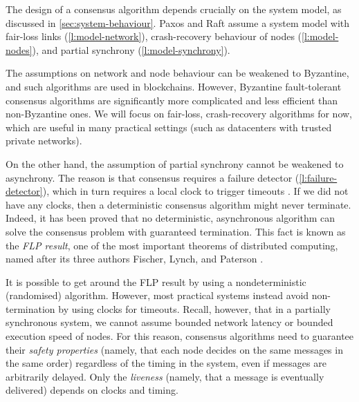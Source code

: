 The design of a consensus algorithm depends crucially on the system model, as discussed in \autoref{sec:system-behaviour}.
Paxos and Raft assume a system model with fair-loss links (\autoref{l:model-network}), crash-recovery behaviour of nodes (\autoref{l:model-nodes}), and partial synchrony (\autoref{l:model-synchrony}).

The assumptions on network and node behaviour can be weakened to Byzantine, and such algorithms are used in blockchains.
However, Byzantine fault-tolerant consensus algorithms are significantly more complicated and less efficient than non-Byzantine ones.
We will focus on fair-loss, crash-recovery algorithms for now, which are useful in many practical settings (such as datacenters with trusted private networks).

On the other hand, the assumption of partial synchrony cannot be weakened to asynchrony.
The reason is that consensus requires a failure detector (\autoref{l:failure-detector}), which in turn requires a local clock to trigger timeouts \citep{Chandra:1996}.
If we did not have any clocks, then a deterministic consensus algorithm might never terminate.
Indeed, it has been proved that no deterministic, asynchronous algorithm can solve the consensus problem with guaranteed termination.
This fact is known as the \emph{FLP result}, one of the most important theorems of distributed computing, named after its three authors Fischer, Lynch, and Paterson \citep{Fischer:1985}.

It is possible to get around the FLP result by using a nondeterministic (randomised) algorithm.
However, most practical systems instead avoid non-termination by using clocks for timeouts.
Recall, however, that in a partially synchronous system, we cannot assume bounded network latency or bounded execution speed of nodes.
For this reason, consensus algorithms need to guarantee their \emph{safety properties} (namely, that each node decides on the same messages in the same order) regardless of the timing in the system, even if messages are arbitrarily delayed.
Only the \emph{liveness} (namely, that a message is eventually delivered) depends on clocks and timing.


